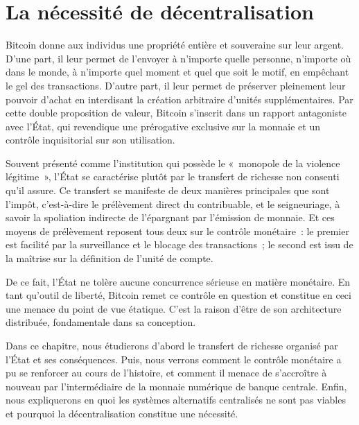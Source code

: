 
\chapter{La nécessité de décentralisation}
\label{ch:4}

Bitcoin donne aux individus une propriété entière et souveraine sur leur argent. D'une part, il leur permet de l'envoyer à n'importe quelle personne, n'importe où dans le monde, à n'importe quel moment et quel que soit le motif, en empêchant le gel des transactions. D'autre part, il leur permet de préserver pleinement leur pouvoir d'achat en interdisant la création arbitraire d'unités supplémentaires. Par cette double proposition de valeur, Bitcoin s'inscrit dans un rapport antagoniste avec l'État, qui revendique une prérogative exclusive sur la monnaie et un contrôle inquisitorial sur son utilisation.

Souvent présenté comme l'institution qui possède le «~monopole de la violence légitime~», l'État se caractérise plutôt par le transfert de richesse non consenti qu'il assure. Ce transfert se manifeste de deux manières principales que sont l'impôt, c'est-à-dire le prélèvement direct du contribuable, et le seigneuriage, à savoir la spoliation indirecte de l'épargnant par l'émission de monnaie. Et ces moyens de prélèvement reposent tous deux sur le contrôle monétaire~: le premier est facilité par la surveillance et le blocage des transactions~; le second est issu de la maîtrise sur la définition de l'unité de compte.

De ce fait, l'État ne tolère aucune concurrence sérieuse en matière monétaire. En tant qu'outil de liberté, Bitcoin remet ce contrôle en question et constitue en ceci une menace du point de vue étatique. C'est la raison d'être de son architecture distribuée, fondamentale dans sa conception.

Dans ce chapitre, nous étudierons d'abord le transfert de richesse organisé par l'État et ses conséquences. Puis, nous verrons comment le contrôle monétaire a pu se renforcer au cours de l'histoire, et comment il menace de s'accroître à nouveau par l'intermédiaire de la monnaie numérique de banque centrale. Enfin, nous expliquerons en quoi les systèmes alternatifs centralisés ne sont pas viables et pourquoi la décentralisation constitue une nécessité.

